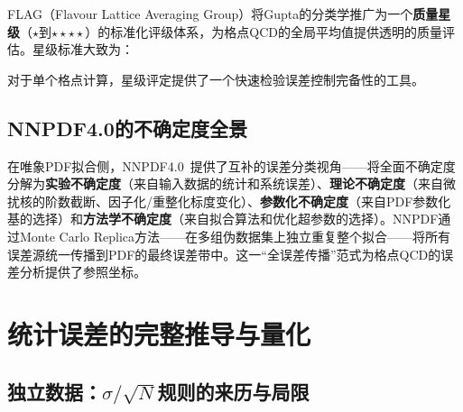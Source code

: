 \documentclass[12pt,a4paper]{ctexart}
\begin{document}
FLAG（Flavour Lattice Averaging Group）将Gupta的分类学推广为一个\textbf{质量星级}（$\star$到$\star\star\star\star$）的标准化评级体系，为格点QCD的全局平均值提供透明的质量评估。星级标准大致为：

\begin{center}
\end{center}

对于单个格点计算，星级评定提供了一个快速检验误差控制完备性的工具。

\subsection{NNPDF4.0的不确定度全景}

在唯象PDF拟合侧，NNPDF4.0~\cite{NNPDF2021}提供了互补的误差分类视角——将全面不确定度分解为\textbf{实验不确定度}（来自输入数据的统计和系统误差）、\textbf{理论不确定度}（来自微扰核的阶数截断、因子化/重整化标度变化）、\textbf{参数化不确定度}（来自PDF参数化基的选择）和\textbf{方法学不确定度}（来自拟合算法和优化超参数的选择）。NNPDF通过Monte Carlo Replica方法——在多组伪数据集上独立重复整个拟合——将所有误差源统一传播到PDF的最终误差带中。这一``全误差传播''范式为格点QCD的误差分析提供了参照坐标。

\section{统计误差的完整推导与量化}

\subsection{独立数据：$\sigma/\sqrt{N}$规则的来历与局限}
\end{document}
